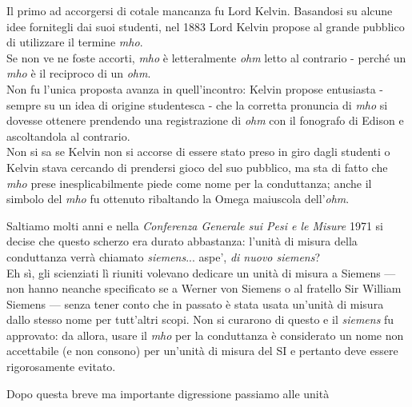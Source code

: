 \begin{digressionwt}
	Il primo ad accorgersi di cotale mancanza fu Lord Kelvin. Basandosi su alcune idee fornitegli dai suoi studenti,  nel 1883 Lord Kelvin propose al grande pubblico di utilizzare il termine \textit{mho}.\\
	Se non ve ne foste accorti, \textit{mho} è letteralmente \textit{ohm} letto al contrario - perché un \textit{mho} è il reciproco di un \textit{ohm}.\\
	Non fu l'unica proposta avanza in quell'incontro: Kelvin propose entusiasta - sempre su un idea di origine studentesca - che la corretta pronuncia di \textit{mho} si dovesse ottenere prendendo una registrazione di \textit{ohm} con il fonografo di Edison e ascoltandola al contrario.\\
	Non si sa se Kelvin non si accorse di essere stato preso in giro dagli studenti o Kelvin stava cercando di prendersi gioco del suo pubblico, ma sta di fatto che \textit{mho} prese inesplicabilmente piede come nome per la conduttanza; anche il simbolo del \textit{mho} fu ottenuto ribaltando la Omega maiuscola dell'\textit{ohm}.
	
	Saltiamo molti anni e nella \textit{Conferenza Generale sui Pesi e le Misure} 1971 si decise che questo scherzo era durato abbastanza: l'unità di misura della conduttanza verrà chiamato \textit{siemens}... aspe', \textit{di nuovo siemens}?\\
	Eh sì, gli scienziati lì riuniti volevano dedicare un unità di misura a Siemens --- non hanno neanche specificato se a Werner von Siemens o al fratello Sir William Siemens --- senza tener conto che in passato è stata usata un'unità di misura dallo stesso nome per tutt'altri scopi. Non si curarono di questo e il \textit{siemens} fu approvato: da allora, usare il \textit{mho} per la conduttanza è considerato un nome non accettabile (e non consono) per un'unità di misura del SI e pertanto deve essere rigorosamente evitato.
	
\end{digressionwt} %
Dopo questa breve ma importante digressione passiamo alle unità 
